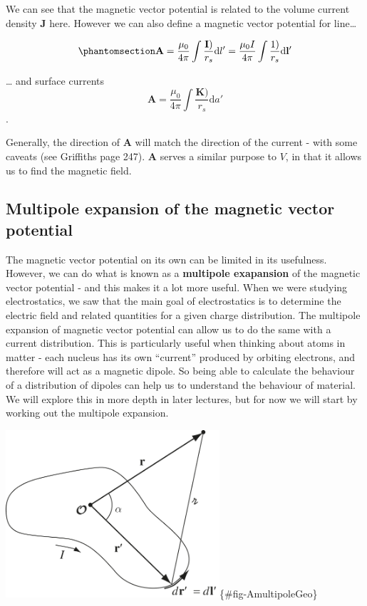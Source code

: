 \documentclass[
  letterpaper,
  DIV=11,
  numbers=noendperiod]{scrreprt}
\begin{document}
We can see that the magnetic vector potential is related to the volume
current density \(\mathrm{\mathbf{J}}\) here. However we can also define
a magnetic vector potential for line\ldots{}

\begin{equation}\phantomsection\label{eq-linecurrA}{ \mathrm{\mathbf{A}}= \frac{\mu_0}{4 \pi} \int \frac{\mathrm{\mathbf{I}})}{r_s} \mathrm{d}l' = \frac{\mu_0 I}{4 \pi} \int \frac{1)}{r_s} \mathrm{d}\mathrm{\mathbf{l}}' }\end{equation}

\ldots{} and surface currents
\[ \mathrm{\mathbf{A}}= \frac{\mu_0}{4 \pi} \int \frac{\mathrm{\mathbf{K}})}{r_s} \mathrm{d}a' \].

Generally, the direction of \(\mathrm{\mathbf{A}}\) will match the
direction of the current - with some caveats (see Griffiths page 247).
\(\mathrm{\mathbf{A}}\) serves a similar purpose to \(V\), in that it
allows us to find the magnetic field.

\subsection{Multipole expansion of the magnetic vector
potential}\label{multipole-expansion-of-the-magnetic-vector-potential}

The magnetic vector potential on its own can be limited in its
usefulness. However, we can do what is known as a \textbf{multipole
exapansion} of the magnetic vector potential - and this makes it a lot
more useful. When we were studying electrostatics, we saw that the main
goal of electrostatics is to determine the electric field and related
quantities for a given charge distribution. The multipole expansion of
magnetic vector potential can allow us to do the same with a current
distribution. This is particularly useful when thinking about atoms in
matter - each nucleus has its own ``current'' produced by orbiting
electrons, and therefore will act as a magnetic dipole. So being able to
calculate the behaviour of a distribution of dipoles can help us to
understand the behaviour of material. We will explore this in more depth
in later lectures, but for now we will start by working out the
multipole expansion.

\includegraphics[width=3.125in,height=\textheight]{Figures/Griffiths_fig5_54.jpg}\{\#fig-AmultipoleGeo\}
\end{document}
